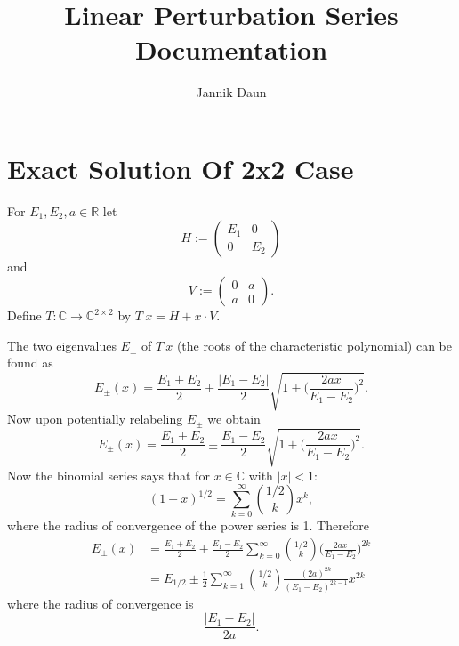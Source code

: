 \documentclass[11pt]{article}
\title{Linear Perturbation Series Documentation}
\author{Jannik Daun}
\begin{document}
\maketitle
\tableofcontents

\section{Exact Solution Of 2x2 Case}

For $E_1, E_2, a \in \mathbb{R}$
let
$$H:=
\begin{pmatrix}
E_1 & 0 \\
0 & E_2
\end{pmatrix}$$
and
$$
V :=
\begin{pmatrix}
0 & a \\
a & 0
\end{pmatrix}.
$$
Define $T: \mathbb{C} \to \mathbb{C}^{2 \times 2}$
by $T \ x =  H + x \cdot V$.

The two eigenvalues $E_\pm$ of $T \  x$ (the roots of the characteristic polynomial) can be found as
\begin{equation}
   E_\pm (x) =  \frac{E_{1}+ E_2}{2}
   \pm \frac{|E_1 -E_2|}{2} \sqrt{
    1 + \bigg(\frac{2 a x}{E_1-E_2}\bigg)^2
   }.
\end{equation}
Now upon potentially relabeling $E_\pm$ we obtain
\begin{equation}
    E_\pm (x) =  \frac{E_{1}+ E_2}{2}
    \pm \frac{E_1 -E_2}{2} \sqrt{
     1 + \bigg(\frac{2 a x}{E_1-E_2}\bigg)^2
    }.
 \end{equation}
Now the binomial series says that for $x \in \mathbb{C}$ with $|x|<1$:
\begin{equation}
    (1+x)^{1/2} = \sum_{k=0}^\infty
    {1/2 \choose k} x^k,
\end{equation}
where the radius of convergence of the power series is 1.
Therefore
\begin{equation}
    \begin{split}
        E_\pm (x) &=  \frac{E_{1}+ E_2}{2}
   \pm \frac{E_1 -E_2}{2} \sum_{k=0}^\infty
   {1/2 \choose k} \bigg(\frac{2 a x}{E_1-E_2}\bigg)^{2k} \\
   &= E_{1/2} \pm \frac{1}{2} \sum_{k=1}^\infty
   {1/2 \choose k} \frac{(2 a)^{2k}}{(E_1-E_2)^{2k-1}} x^{2k}
    \end{split}
\end{equation}
where the radius of convergence is
\begin{equation}
    \frac{|E_1 -E_2|}{2a} .
\end{equation}
\end{document}
